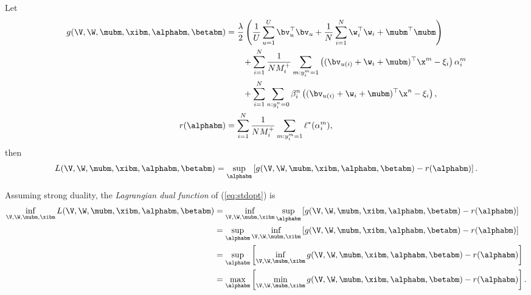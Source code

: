 Let
\begin{equation*}
\begin{aligned}
g(\V, \W, \mubm, \xibm, \alphabm, \betabm)
&= \frac{\lambda}{2} \left( \frac{1}{U} \sum_{u=1}^U \bv_u^\top \bv_u 
     + \frac{1}{N} \sum_{i=1}^N \w_i^\top \w_i + \mubm^\top \mubm \right) \\
& \hspace{2em}
     + \sum_{i=1}^N \frac{1}{N M_i^+} \sum_{m: y_i^m = 1} \left( (\bv_{u(i)} + \w_i + \mubm)^\top \x^m - \xi_i \right) \alpha_i^m \\
& \hspace{2em}
     + \sum_{i=1}^N \sum_{n: y_i^n = 0} \beta_i^n \left( (\bv_{u(i)} + \w_i + \mubm)^\top \x^n - \xi_i \right), \\
r(\alphabm)
&= \sum_{i=1}^N \frac{1}{N M_i^+} \sum_{m: y_i^m = 1} \ell^*(\alpha_i^m),
\end{aligned}
\end{equation*}
then 
\begin{equation*}
\begin{aligned}
L(\V, \W, \mubm, \xibm, \alphabm, \betabm) 
= \sup_\alphabm \left[ g(\V, \W, \mubm, \xibm, \alphabm, \betabm) - r(\alphabm) \right].
\end{aligned}
\end{equation*}

Assuming strong duality, the \emph{Lagrangian dual function} of (\ref{eq:stdopt}) is
\begin{equation*}
\begin{aligned}
\inf_{\V, \W, \mubm, \xibm} L(\V, \W, \mubm, \xibm, \alphabm, \betabm) 
&= \inf_{\V, \W, \mubm, \xibm} \sup_\alphabm \left[ g(\V, \W, \mubm, \xibm, \alphabm, \betabm) - r(\alphabm) \right] \\
&= \sup_\alphabm \inf_{\V, \W, \mubm, \xibm} \left[ g(\V, \W, \mubm, \xibm, \alphabm, \betabm) - r(\alphabm) \right] \\
&= \sup_\alphabm \left[ \inf_{\V, \W, \mubm, \xibm} g(\V, \W, \mubm, \xibm, \alphabm, \betabm) - r(\alphabm) \right] \\
&= \max_\alphabm \left[ \min_{\V, \W, \mubm, \xibm} g(\V, \W, \mubm, \xibm, \alphabm, \betabm) - r(\alphabm) \right].
\end{aligned}
\end{equation*}

